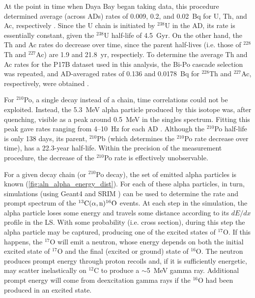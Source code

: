 \documentclass[../thesis.tex]{subfiles}
\begin{document}
At the point in time when Daya Bay began taking data, this procedure determined average (across ADs) rates of 0.009, 0.2, and 0.02~Bq for U, Th, and Ac, respectively \cite{lianghongBkg}. Since the U chain is initiated by $^{238}$U in the AD, its rate is essentially constant, given the $^{238}$U half-life of 4.5~Gyr. On the other hand, the Th and Ac rates do decrease over time, since the parent half-lives (i.e. those of $^{228}$Th and $^{227}$Ac) are 1.9 and 21.8~yr, respectiely. To determine the average Th and Ac rates for the P17B dataset used in this analysis, the Bi-Po cascade selection was repeated, and AD-averaged rates of 0.136 and 0.0178~Bq for $^{228}$Th and $^{227}$Ac, respectively, were obtained \cite{lianghongBkg}.

For $^{210}$Po, a single decay instead of a chain, time correlations could not be exploited. Instead, the 5.3~MeV alpha particle produced by this isotope was, after quenching, visible as a peak around 0.5~MeV in the singles spectrum. Fitting this peak gave rates ranging from 4--10~Hz for each AD \cite{zeyuanAln}. Although the $^{210}$Po half-life is only 138 days, its parent, $^{210}$Pb (which determines the $^{210}$Po rate decrease over time), has a 22.3-year half-life. Within the precision of the measurement procedure, the decrease of the $^{210}$Po rate is effectively unobservable.

For a given decay chain (or $^{210}$Po decay), the set of emitted alpha particles is known (\autoref{fig:aln_alpha_energy_dist}). For each of these alpha particles, in turn, simulations (using Geant4 \cite{Geant4} and SRIM \cite{SRIM}) can be used to determine the rate and prompt spectrum of the $^{13}\mathrm{C}(\alpha, \mathrm{n})^{16}\mathrm{O}$ events. At each step in the simulation, the alpha particle loses some energy and travels some distance according to its $dE/dx$ profile in the LS. With some probability (i.e. cross section), during this step the alpha particle may be captured, producing one of the excited states of $^{17}$O. If this happens, the $^{17}$O will emit a neutron, whose energy depends on both the initial excited state of $^{17}$O and the final (excited or ground) state of $^{16}$O. The neutron produces prompt energy through proton recoils and, if it is sufficiently energetic, may scatter inelastically on $^{12}$C to produce a $\sim$5~MeV gamma ray. Additional prompt energy will come from deexcitation gamma rays if the $^{16}$O had been produced in an excited state.
\end{document}
